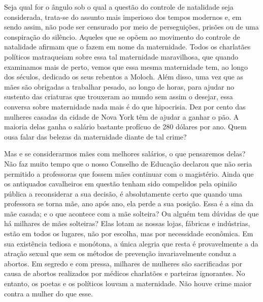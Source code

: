 Seja qual for o ângulo sob o qual a questão do controle de natalidade seja
considerada, trata-se do assunto mais imperioso dos tempos modernos e, em sendo
assim, não pode ser censurado por meio de perseguições, prisões ou de uma
conspiração do silêncio. Aqueles que se opõem ao movimento do controle
de natalidade afirmam que o fazem em nome da maternidade. Todos os
charlatães políticos matraqueiam sobre essa tal maternidade maravilhosa,
que quando examinamos mais de perto, vemos que essa mesma maternidade
tem, ao longo dos séculos, dedicado os seus rebentos a Moloch. Além
disso, uma vez que as mães são obrigadas a trabalhar pesado, ao longo de
horas, para ajudar no sustento das criaturas que trouxeram ao mundo sem
assim o desejar, essa conversa sobre maternidade nada mais é do que
hipocrisia. Dez por cento das mulheres casadas da cidade de Nova York
têm de ajudar a ganhar o pão. A maioria delas ganha o salário bastante
profícuo de 280 dólares por ano. Quem ousa falar das belezas da maternidade
diante de tal crime?

Mas e se considerarmos mães com melhores salários, o que pensaremos
delas? Não faz muito tempo que o nosso Conselho de Educação declarou que
não seria permitido a professoras que fossem mães continuar com o
magistério. Ainda que os antiquados cavalheiros em questão tenham sido
compelidos pela opinião pública a reconsiderar a sua decisão, é
absolutamente certo que quando uma professora se torna mãe, ano após
ano, ela perde a sua posição. Essa é a sina da mãe casada; e o que
acontece com a mãe solteira? Ou alguém tem dúvidas de que há milhares de
mães solteiras? Elas lotam as nossas lojas, fábricas e indústrias, estão
em todos os lugares, não por escolha, mas por necessidade econômica. Em
sua existência tediosa e monótona, a única alegria que resta é
provavelmente a da atração sexual que sem os métodos de prevenção
invariavelmente conduz a abortos. Em segredo e com pressa, milhares de
mulheres são sacrificadas por causa de abortos realizados por médicos
charlatões e parteiras ignorantes. No entanto, os poetas e os políticos
louvam a maternidade. Não houve crime maior contra a mulher do que esse.

